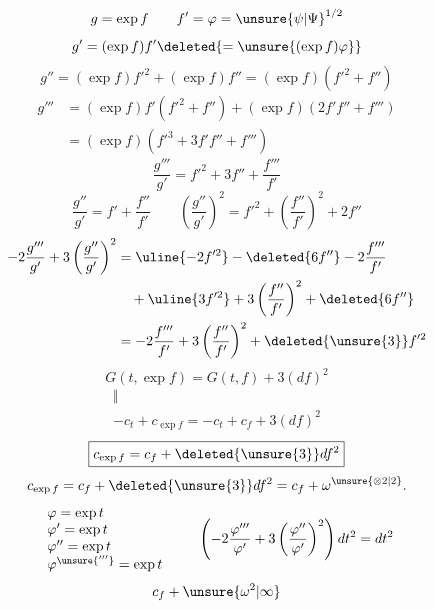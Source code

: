\[
g=\exp f\qquad f'=\varphi=\unsure{\psi|\Psi}^{1/2}
\]
\[
g'=(\exp f)f'\deleted{=\unsure{(\exp f)\varphi}}
\]
\[
g''=(\exp f)f'^2+(\exp f)f''=(\exp f)(f'^2+f'')
\]
\[
\begin{aligned}
g'''&=(\exp f)f'(f'^2+f'')+(\exp f)(2f'f''+f''')\\
&=(\exp f)(f'^3+3f'f''+f''')
\end{aligned}
\]
\[
\frac{g'''}{g'}=f'^2+3f''+\frac{f'''}{f'}
\]
\[
\frac{g''}{g'}=f'+\frac{f''}{f'}\qquad
\left(\frac{g''}{g'}\right)^2=f'^2+\left(\frac{f''}{f'}\right)^2+2f''
\]
\[
\begin{aligned}
-2\frac{g'''}{g'}+3\left(\frac{g''}{g'}\right)^2
&=\uline{-2f'^2}-\deleted{6f''}-2\frac{f'''}{f'}\\
&\quad+\uline{3f'^2}+3\left(\frac{f''}{f'}\right)^2+\deleted{6f''}\\
&=-2\frac{f'''}{f'}+3\left(\frac{f''}{f'}\right)^2+\deleted{\unsure{3}}f'^2
\end{aligned}
\]
\[
G(t,\exp f)=G(t,f)+3(df)^2
\]
\[
\begin{array}{c}
\Vert\\
-c_t+c_{\exp f}=-c_t+c_f+3(df)^2
\end{array}
\]
\[
\boxed{c_{\exp f}=c_f+\deleted{\unsure{3}}df^2}
\]
\[
c_{\exp f}=c_f+\deleted{\unsure{3}}df^2=c_f+\omega^{\unsure{\otimes2|2}}.
\]
\[
\begin{array}{l}
\varphi=\exp t\\
\varphi'=\exp t\\
\varphi''=\exp t\\
\varphi^{\unsure{'''}}=\exp t
\end{array}
\qquad
\left(-2\frac{\varphi'''}{\varphi'}+3\left(\frac{\varphi''}{\varphi'}\right)^2\right)dt^2=dt^2
\]
\[
c_f+\unsure{\omega^2|\infty}
\]


